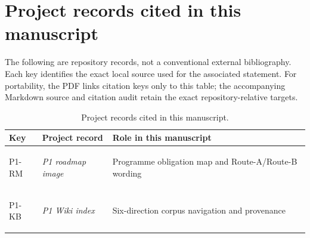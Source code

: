 \clearpage
\appendix
\hypertarget{project-records-cited-in-this-manuscript}{%
\section{Project records cited in this manuscript}\label{project-records-cited-in-this-manuscript}}

The following are repository records, not a conventional external bibliography. Each key identifies the exact local source used for the associated statement.
For portability, the PDF links citation keys only to this table; the accompanying Markdown source and citation audit retain the exact repository-relative targets.

\begingroup
\footnotesize
\renewcommand{\arraystretch}{0.90}
\setlength{\LTpre}{0pt}
\setlength{\LTpost}{0pt}
\begin{longtable}[]{@{}lll@{}}
\caption{Project records cited in this manuscript.}\\
\toprule
\begin{minipage}[b]{0.30\columnwidth}\raggedright
Key\strut
\end{minipage} & \begin{minipage}[b]{0.30\columnwidth}\raggedright
Project record\strut
\end{minipage} & \begin{minipage}[b]{0.30\columnwidth}\raggedright
Role in this manuscript\strut
\end{minipage}\tabularnewline
\midrule
\endhead
\begin{minipage}[t]{0.30\columnwidth}\raggedright
\hypertarget{record:P1-RM}{P1-RM}\strut
\end{minipage} & \begin{minipage}[t]{0.30\columnwidth}\raggedright
\textit{P1 roadmap image}\strut
\end{minipage} & \begin{minipage}[t]{0.30\columnwidth}\raggedright
Programme obligation map and Route-A/Route-B wording\strut
\end{minipage}\tabularnewline
\begin{minipage}[t]{0.30\columnwidth}\raggedright
\hypertarget{record:P1-KB}{P1-KB}\strut
\end{minipage} & \begin{minipage}[t]{0.30\columnwidth}\raggedright
\textit{P1 Wiki index}\strut
\end{minipage} & \begin{minipage}[t]{0.30\columnwidth}\raggedright
Six-direction corpus navigation and provenance\strut

\end{minipage}
\end{longtable}
